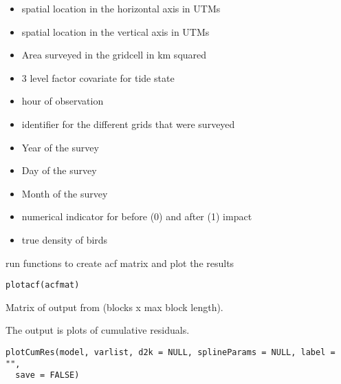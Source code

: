 \documentclass[a4paper]{book}
\begin{document}
\begin{Details}\relax
\begin{itemize}

\item {} spatial location in the horizontal axis in UTMs
\item {} spatial location in the vertical axis in UTMs
\item {} Area surveyed in the gridcell in km squared
\item {} 3 level factor covariate for tide state
\item {} hour of observation
\item {} identifier for the different grids that were surveyed
\item {} Year of the survey
\item {} Day of the survey
\item {} Month of the survey 
\item {} numerical indicator for before (0) and after (1) impact
\item {} true density of birds

\end{itemize}

\end{Details}
%
\begin{Description}\relax
run functions to create acf matrix and plot the results
\end{Description}
%
\begin{Usage}
\begin{verbatim}
plotacf(acfmat)
\end{verbatim}
\end{Usage}
%
\begin{Arguments}
\begin{ldescription}
\item[\code{acfmat}] Matrix of output from  (blocks x max block length).
\end{ldescription}
\end{Arguments}
%
\begin{Description}\relax
The output is plots of cumulative residuals.
\end{Description}
%
\begin{Usage}
\begin{verbatim}
plotCumRes(model, varlist, d2k = NULL, splineParams = NULL, label = "",
  save = FALSE)
\end{verbatim}
\end{Usage}
\end{document}
